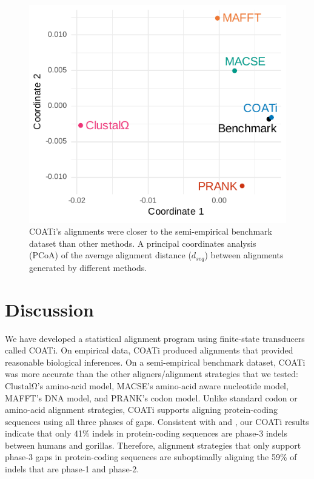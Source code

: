 \documentclass[12pt,letterpaper]{article}
\begin{document}
\begin{figure}[h!]
    \centering%
    \includegraphics{figures/fig-dseq-benchmarks.pdf}
    \par
    \caption{COATi's alignments were closer to the semi-empirical benchmark dataset than other methods. A principal coordinates analysis (PCoA) of the average alignment distance ($d_{seq}$) between alignments generated by different methods.
%
    \label{fig:dseq-benchmarks}}
\end{figure}

\clearpage

\section*{Discussion}

We have developed a statistical alignment program using finite-state transducers called COATi. On empirical data, COATi produced alignments that provided reasonable biological inferences. On a semi-empirical benchmark dataset, COATi was more accurate than the other aligners/alignment strategies that we tested: ClustalΩ's amino-acid model, MACSE's amino-acid aware nucleotide model, MAFFT's DNA model, and PRANK's codon model. Unlike standard codon or amino-acid alignment strategies, COATi supports aligning protein-coding sequences using all three phases of gaps. Consistent with \cite{taylor2004occurrence} and \cite{zhu2022profiling}, our COATi results indicate that only 41\% indels in protein-coding sequences are phase-3 indels between humans and gorillas. Therefore, alignment strategies that only support phase-3 gaps in protein-coding sequences are suboptimally aligning the 59\% of indels that are phase-1 and phase-2.
\end{document}
